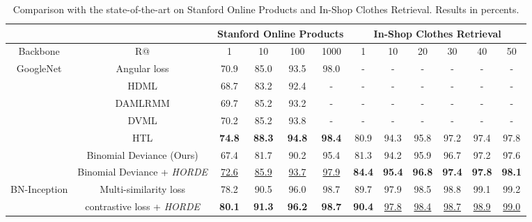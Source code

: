\documentclass[10pt,twocolumn,letterpaper]{article}
\def\ourmethod{\textit{HORDE}}
\begin{document}
    \begin{table*}[t!]
        \footnotesize
        \begin{center}
            \begin{tabular}{|c|c|cccc|cccccc|}\hline
                 & & \multicolumn{4}{c|}{Stanford Online Products} & \multicolumn{6}{c|}{In-Shop Clothes Retrieval} \\\hline
                Backbone & R@ & 1 & 10 & 100 & 1000 & 1 & 10 & 20 & 30 & 40 & 50 \\\hline
\multirow{7}{*}{GoogleNet} & Angular loss \cite{Wang_2017_ICCV} & 70.9 & 85.0 & 93.5 & 98.0 & - & - & - & - & - & - \\
                & HDML \cite{Zheng_2019_CVPR} & 68.7 & 83.2 & 92.4 & - & - & - & - & - & - & - \\
                & DAMLRMM \cite{Xu_2019_CVPR} & 69.7 & 85.2 & 93.2 & - & - & - & - & - & - & - \\
                & DVML \cite{Lin_2018_ECCV} & 70.2 & 85.2 & 93.8 & - & - & - & - & - & - & - \\
& HTL \cite{Ge_2018_ECCV} & \textbf{74.8} & \textbf{88.3} & \textbf{94.8} & \textbf{98.4} & 80.9 & 94.3 & 95.8 & 97.2 & 97.4 & 97.8\\
                \cline{2-12}
& Binomial Deviance (Ours) & 67.4 & 81.7 & 90.2 & 95.4 & 81.3 & 94.2 & 95.9 & 96.7 & 97.2 & 97.6 \\
                & Binomial Deviance + \ourmethod & \underline{72.6} & \underline{85.9} & \underline{93.7} & \underline{97.9} & \textbf{84.4} & \textbf{95.4} & \textbf{96.8} & \textbf{97.4} & \textbf{97.8} & \textbf{98.1} \\
                \hline
                \multirow{2}{*}{BN-Inception} & Multi-similarity loss \cite{Wang_2019_CVPR} & 78.2 & 90.5 & 96.0 & 98.7 & 89.7 & 97.9 & 98.5 & 98.8 & 99.1 & 99.2 \\
                \cline{2-12}
                & contrastive loss + \ourmethod & \textbf{80.1} & \textbf{91.3} & \textbf{96.2} & \textbf{98.7}& \textbf{90.4} & \underline{97.8} & \underline{98.4} & \underline{98.7} & \underline{98.9} & \underline{99.0} \\
                \hline
            \end{tabular}
            \caption{Comparison with the state-of-the-art on Stanford Online Products and In-Shop Clothes Retrieval. Results in percents.}
            \label{tab:SOP-INSHOP}
        \end{center}
        \vspace{-1.5em}
    \end{table*} 
\end{document}
